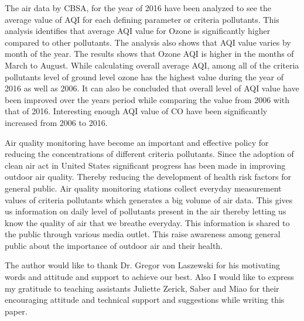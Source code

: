 \documentclass[sigconf]{acmart}
\begin{document}
   The  air data by CBSA, for the year of 2016  have been analyzed to see the average value of AQI for each defining parameter or criteria pollutants. This analysis identifies that average AQI value for Ozone is significantly higher compared to other pollutants. The analysis also shows that AQI value varies by month of the year. The results shows that Ozone AQI is higher in the months of March to August. While calculating overall average AQI, among all of the criteria pollutants level of ground level ozone has the highest value during the year of 2016 as well as 2006. It can also be concluded that overall level of AQI value have been improved over the years period while comparing the value from 2006 with that of 2016. Interesting enough AQI value of CO have been significantly increased from 2006 to 2016.
   
   Air quality monitoring have become an important and effective policy for reducing the concentrations of different criteria pollutants. Since the adoption of clean air act 
   in United States significant progress has been made in improving outdoor air quality.
   Thereby reducing the development of health risk factors for general public. Air quality monitoring stations collect everyday measurement values of criteria pollutants which generates a big volume of air data. This gives us information on daily level of pollutants present in the air thereby letting us know the quality of air that we breathe everyday. This information is shared to the public through various media outlet. This raise awareness among general public about the importance of outdoor air and their health.
   
  
  
\begin{acks}

  The author would like to thank Dr. Gregor von Laszewski for his motivating words and attitude and support to achieve our best. Also I would like to express my gratitude to teaching assistants Juliette Zerick, Saber and Miao for their encouraging attitude and technical support and suggestions while writing this paper.
  

\end{acks}


 
\end{document}
